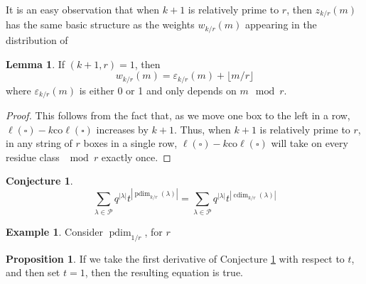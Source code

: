 \documentclass{amsart}[12pt]
\theoremstyle{definition}
\newtheorem{lemma}[dummy]{Lemma}
\newtheorem{example}[dummy]{Example}
\newtheorem{proposition}[dummy]{Proposition}
\newtheorem{conjecture}[dummy]{Conjecture}
\newcommand{\PP}{\mathcal{P}} %
\newcommand{\coleg}{\text{co}\ell}
\DeclareMathOperator{\dusty}{pdim}
\DeclareMathOperator{\cdim}{cdim}
\begin{document}
It is an easy observation that when $k+1$ is relatively prime to $r$, then $z_{k/r}(m)$ has the same basic structure as the weights $w_{k/r}(m)$ appearing in the distribution of 

\begin{lemma} \label{lem:dusty-lemma}
If $(k+1,r)=1$, then 
$$w_{k/r}(m)=\varepsilon_{k/r}(m)+\lfloor m/r\rfloor$$
where $\varepsilon_{k/r}(m)$ is either 0 or 1 and only depends on $m\mod r$.
\end{lemma}

\begin{proof}
This follows from the fact that, as we move one box to the left in a row, $\ell(\square)-k\coleg(\square)$ increases by $k+1$.  Thus, when $k+1$ is relatively prime to $r$, in any string of $r$ boxes in a single row, $\ell(\square)-k\coleg(\square)$ will take on every residue class $\mod r$ exactly once. 
\end{proof}

\begin{conjecture} \label{conj:dusty}
$$\sum_{\lambda\in \PP} q^{|\lambda|} t^{|\dusty_{k/r}(\lambda)|}=\sum_{\lambda\in \PP} q^{|\lambda|} t^{|\cdim_{k/r}(\lambda)|}$$
\end{conjecture}


\begin{example}
Consider $\dusty_{1/r}$, for $r$ 

\end{example}


\begin{proposition}
If we take the first derivative of Conjecture \ref{conj:dusty} with respect to $t$, and then set $t=1$, then the resulting equation is true.  
\end{proposition}
\end{document}
